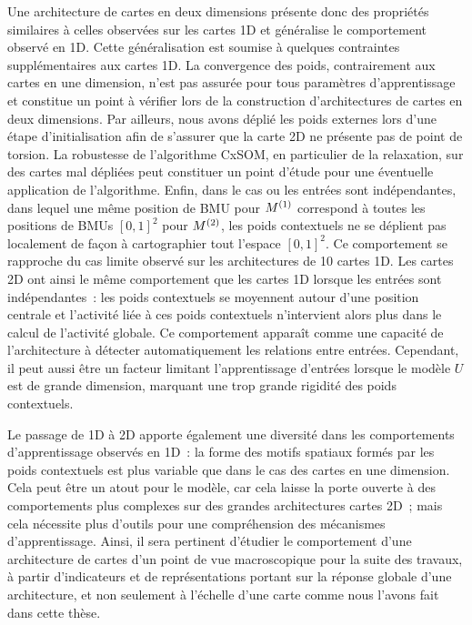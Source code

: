 \documentclass[../main]{subfiles}
\begin{document}
Une architecture de cartes en deux dimensions présente donc des propriétés similaires à celles observées sur les cartes 1D et généralise le comportement observé en 1D.
Cette généralisation est soumise à quelques contraintes supplémentaires aux cartes 1D.
La convergence des poids, contrairement aux cartes en une dimension, n'est pas assurée pour tous paramètres d'apprentissage et constitue un point à vérifier lors de la construction d'architectures de cartes en deux dimensions.
Par ailleurs, nous avons déplié les poids externes lors d'une étape d'initialisation afin de s'assurer que la carte 2D ne présente pas de point de torsion. La robustesse de l'algorithme CxSOM, en particulier de la relaxation, sur des cartes \og mal dépliées \fg{} peut constituer un point d'étude pour une éventuelle application de l'algorithme.
Enfin, dans le cas ou les entrées sont indépendantes, dans lequel une même position de BMU pour $M^{({1})}$ correspond à toutes les positions de BMUs $[0,1]^2$ pour $M^{({2})}$, les poids contextuels ne se déplient pas localement de façon à cartographier tout l'espace $[0,1]^2$.
Ce comportement se rapproche du cas limite observé sur les architectures de 10 cartes 1D. 
Les cartes 2D ont ainsi le même comportement que les cartes 1D lorsque les entrées sont indépendantes~: les poids contextuels se moyennent autour d'une position centrale et l'activité liée à ces poids contextuels n'intervient alors plus dans le calcul de l'activité globale.
Ce comportement apparaît comme une capacité de l'architecture à détecter automatiquement les relations entre entrées. Cependant, il peut aussi être un facteur limitant l'apprentissage d'entrées lorsque le modèle $U$ est de grande dimension, marquant une trop grande rigidité des poids contextuels. 

Le passage de 1D à 2D apporte également une diversité dans les comportements d'apprentissage observés en 1D~: la forme des motifs spatiaux formés par les poids contextuels est plus variable que dans le cas des cartes en une dimension.
Cela peut être un atout pour le modèle, car cela laisse la porte ouverte à des comportements plus complexes sur des grandes architectures cartes 2D~; mais cela nécessite plus d'outils pour une compréhension des mécanismes d'apprentissage.
Ainsi, il sera pertinent d'étudier le comportement d'une architecture de cartes d'un point de vue macroscopique pour la suite des travaux, à partir d'indicateurs et de représentations portant sur la réponse globale d'une architecture, et non seulement à l'échelle d'une carte comme nous l'avons fait dans cette thèse.

\ifSubfilesClassLoaded{
    \printbibliography
}{}
\end{document}
